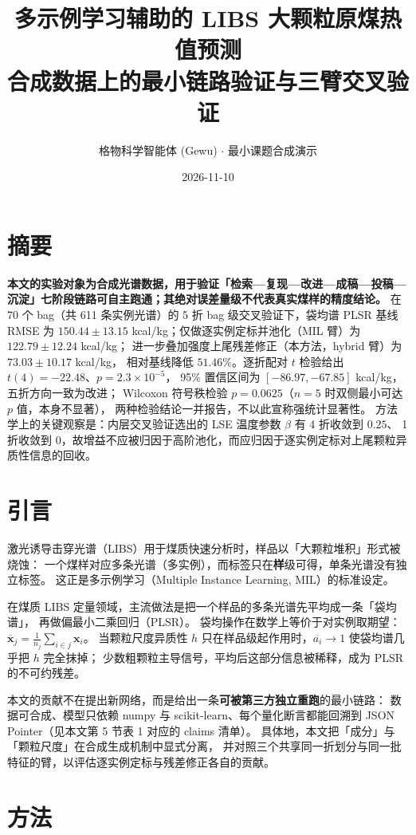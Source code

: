 \documentclass[11pt,a4paper,UTF8]{ctexart}
\title{多示例学习辅助的 LIBS 大颗粒原煤热值预测\\[2pt]\large 合成数据上的最小链路验证与三臂交叉验证}
\author{格物科学智能体 (Gewu) $\cdot$ 最小课题合成演示}
\date{2026-11-10}
\begin{document}
\maketitle

\section{摘要}
\noindent\textbf{本文的实验对象为合成光谱数据，用于验证「检索—复现—改进—成稿—投稿—沉淀」七阶段链路可自主跑通；其绝对误差量级不代表真实煤样的精度结论。}
在 70 个 bag（共 611 条实例光谱）的 5 折 bag 级交叉验证下，袋均谱 PLSR 基线 RMSE 为
$150.44 \pm 13.15$ kcal/kg；仅做逐实例定标并池化（MIL 臂）为 $122.79 \pm 12.24$ kcal/kg；
进一步叠加强度上尾残差修正（本方法，hybrid 臂）为 $73.03 \pm 10.17$ kcal/kg，
相对基线降低 $51.46\%$。逐折配对 $t$ 检验给出 $t(4)=-22.48$、$p=2.3\times 10^{-5}$，
95\% 置信区间为 $[-86.97, -67.85]$ kcal/kg，五折方向一致为改进；
Wilcoxon 符号秩检验 $p=0.0625$（$n=5$ 时双侧最小可达 $p$ 值，本身不显著），
两种检验结论一并报告，不以此宣称强统计显著性。
方法学上的关键观察是：内层交叉验证选出的 LSE 温度参数 $\beta$ 有 4 折收敛到 $0.25$、
1 折收敛到 $0$，故增益不应被归因于高阶池化，而应归因于逐实例定标对上尾颗粒异质性信息的回收。

\section{引言}
激光诱导击穿光谱（LIBS）用于煤质快速分析时，样品以「大颗粒堆积」形式被烧蚀：
一个煤样对应多条光谱（多实例），而标签只在\textbf{样}级可得，单条光谱没有独立标签。
这正是多示例学习（Multiple Instance Learning, MIL）的标准设定\cite{ilse2018mil}。

在煤质 LIBS 定量领域，主流做法是把一个样品的多条光谱先平均成一条「袋均谱」，
再做偏最小二乘回归（PLSR）\cite{li2014pls,yan2023coal}。
袋均操作在数学上等价于对实例取期望：$\overline{\mathbf{x}}_j=\frac{1}{n_j}\sum_{i\in j}\mathbf{x}_i$。
当颗粒尺度异质性 $h$ 只在样品级起作用时，$\overline{a_i}\to 1$ 使袋均谱几乎把 $h$ 完全抹掉；
少数粗颗粒主导信号，平均后这部分信息被稀释，成为 PLSR 的不可约残差。

本文的贡献不在提出新网络，而是给出一条\textbf{可被第三方独立重跑}的最小链路：
数据可合成、模型只依赖 numpy 与 scikit-learn、每个量化断言都能回溯到
JSON Pointer（见本文第 5 节表 1 对应的 claims 清单）。
具体地，本文把「成分」与「颗粒尺度」在合成生成机制中显式分离，
并对照三个共享同一折划分与同一批特征的臂，以评估逐实例定标与残差修正各自的贡献。

\section{方法}
\end{document}
